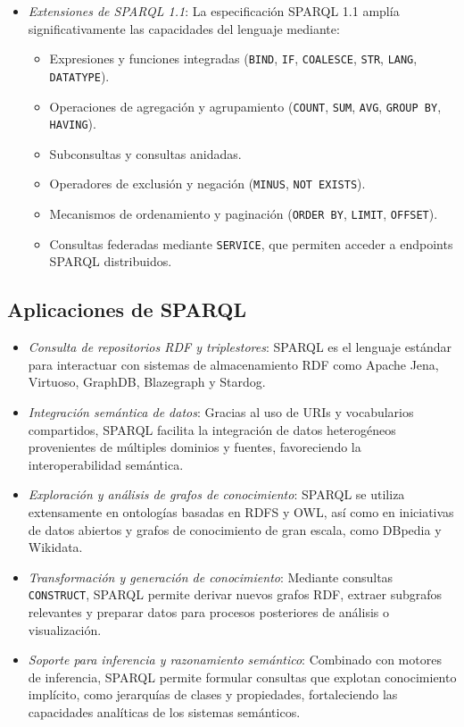 \documentclass{article}
\begin{document}
\begin{itemize}
    \item \textit{Extensiones de SPARQL 1.1}:  
    La especificación SPARQL 1.1 amplía significativamente las capacidades del lenguaje mediante:
    \begin{itemize}
        \item Expresiones y funciones integradas (\texttt{BIND}, \texttt{IF}, \texttt{COALESCE}, \texttt{STR}, \texttt{LANG}, \texttt{DATATYPE}).
        \item Operaciones de agregación y agrupamiento (\texttt{COUNT}, \texttt{SUM}, \texttt{AVG}, \texttt{GROUP BY}, \texttt{HAVING}).
        \item Subconsultas y consultas anidadas.
        \item Operadores de exclusión y negación (\texttt{MINUS}, \texttt{NOT EXISTS}).
        \item Mecanismos de ordenamiento y paginación (\texttt{ORDER BY}, \texttt{LIMIT}, \texttt{OFFSET}).
        \item Consultas federadas mediante \texttt{SERVICE}, que permiten acceder a endpoints SPARQL distribuidos.
    \end{itemize}
\end{itemize}

\subsection{Aplicaciones de SPARQL}

\begin{itemize}
    \item \textit{Consulta de repositorios RDF y triplestores}:  
    SPARQL es el lenguaje estándar para interactuar con sistemas de almacenamiento RDF como Apache Jena, Virtuoso, GraphDB, Blazegraph y Stardog.

    \item \textit{Integración semántica de datos}:  
    Gracias al uso de URIs y vocabularios compartidos, SPARQL facilita la integración de datos heterogéneos provenientes de múltiples dominios y fuentes, favoreciendo la interoperabilidad semántica.

    \item \textit{Exploración y análisis de grafos de conocimiento}:  
    SPARQL se utiliza extensamente en ontologías basadas en RDFS y OWL, así como en iniciativas de datos abiertos y grafos de conocimiento de gran escala, como DBpedia y Wikidata.

    \item \textit{Transformación y generación de conocimiento}:  
    Mediante consultas \texttt{CONSTRUCT}, SPARQL permite derivar nuevos grafos RDF, extraer subgrafos relevantes y preparar datos para procesos posteriores de análisis o visualización.

    \item \textit{Soporte para inferencia y razonamiento semántico}:  
    Combinado con motores de inferencia, SPARQL permite formular consultas que explotan conocimiento implícito, como jerarquías de clases y propiedades, fortaleciendo las capacidades analíticas de los sistemas semánticos.
\end{itemize}
\end{document}
